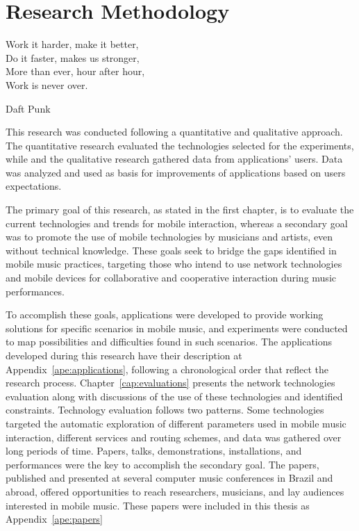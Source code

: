 \chapter{Research Methodology}
\label{cap:research}

 \epigraph{
 Work it harder, make it better,\\
 Do it faster, makes us stronger,\\
 More than ever, hour after hour,\\
 Work is never over.}
 {Daft Punk}

This research was conducted following a quantitative and qualitative approach.
The quantitative research evaluated the technologies selected for the experiments, while and the qualitative research gathered data from applications' users.
Data was analyzed and used as basis for improvements of applications based on users expectations.

The primary goal of this research, as stated in the first chapter, is to evaluate the current technologies and trends for mobile interaction, whereas 
a secondary goal was to promote the use of mobile technologies by musicians and artists, even without technical knowledge.
These goals seek to bridge the gaps identified in mobile music practices, targeting those who intend to use network technologies and mobile devices for collaborative and cooperative interaction during music performances.


To accomplish these goals, applications were developed to provide working solutions for specific scenarios in mobile music, and experiments were conducted to map possibilities and difficulties found in such scenarios.
The applications developed during this research have their description at Appendix~\ref{ape:applications}, following a chronological order that reflect the research process.
Chapter~\ref{cap:evaluations} presents the network technologies evaluation along with discussions of the use of these technologies and identified constraints.
Technology evaluation follows two patterns. 
Some technologies targeted the automatic exploration of different parameters used in mobile music interaction, different services and routing schemes, and data was gathered over long periods of time.
Papers, talks, demonstrations, installations, and performances were the key to accomplish the secondary goal.
The papers, published and presented at several computer music conferences in Brazil and abroad, offered opportunities to reach researchers, musicians, and lay audiences interested in mobile music.
These papers were included in this thesis as Appendix~\ref{ape:papers}

